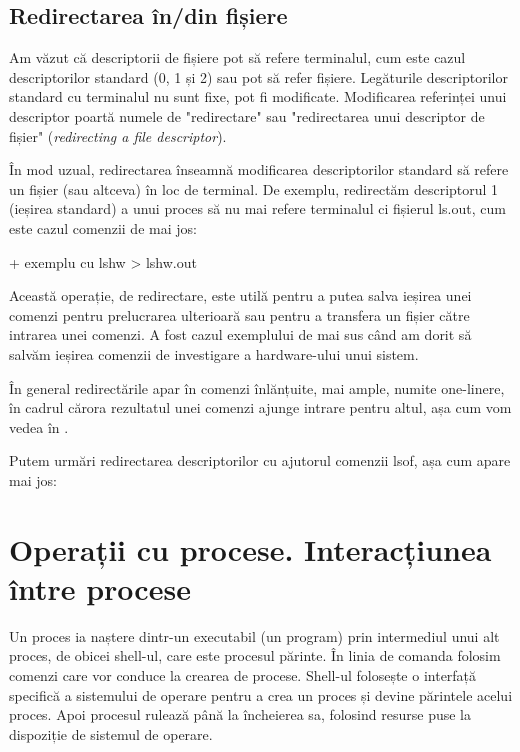 \subsection{Redirectarea în/din fișiere}
\label{sec:procese-fisiere-redirectare}

Am văzut că descriptorii de fișiere pot să refere terminalul, cum este cazul
descriptorilor standard (0, 1 și 2) sau pot să refer fișiere. Legăturile
descriptorilor standard cu terminalul nu sunt fixe, pot fi modificate.
Modificarea referinței unui descriptor poartă numele de "redirectare" sau
"redirectarea unui descriptor de fișier" (\textit{redirecting a file descriptor}).

În mod uzual, redirectarea înseamnă modificarea descriptorilor standard să
refere un fișier (sau altceva) în loc de terminal. De exemplu, redirectăm
descriptorul 1 (ieșirea standard) a unui proces să nu mai refere terminalul ci
fișierul ls.out, cum este cazul comenzii de mai jos:

+ exemplu cu lshw > lshw.out

Această operație, de redirectare, este utilă pentru a putea salva ieșirea unei
comenzi pentru prelucrarea ulterioară sau pentru a transfera un fișier către
intrarea unei comenzi. A fost cazul exemplului de mai sus când am dorit să
salvăm ieșirea comenzii de investigare a hardware-ului unui sistem.

În general redirectările apar în comenzi înlănțuite, mai ample, numite
one-linere, în cadrul cărora rezultatul unei comenzi ajunge intrare pentru
altul, așa cum vom vedea în
.

Putem urmări redirectarea descriptorilor cu ajutorul comenzii lsof, așa cum apare mai jos:

\section{Operații cu procese. Interacțiunea între procese}
\label{sec:procese-operatii}

Un proces ia naștere dintr-un executabil (un program) prin intermediul unui alt
proces, de obicei shell-ul, care este procesul părinte. În linia de comanda
folosim comenzi care vor conduce la crearea de procese. Shell-ul folosește o
interfață specifică a sistemului de operare pentru a crea un proces și devine
părintele acelui proces. Apoi procesul rulează până la încheierea sa, folosind
resurse puse la dispoziție de sistemul de operare.

